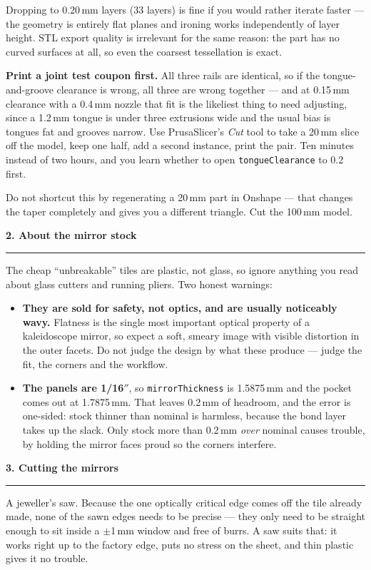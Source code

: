 \documentclass[letterpaper,11pt]{article}
\newcommand{\head}[1]{\vspace{3mm}\textbf{\large #1}\vspace{1mm}\hrule\vspace{2mm}}
\begin{document}
Dropping to 0.20\,mm layers (33 layers) is fine if you would rather iterate faster --- the
geometry is entirely flat planes and ironing works independently of layer height. STL export
quality is irrelevant for the same reason: the part has no curved surfaces at all, so even the
coarsest tessellation is exact.

\medskip

\textbf{Print a joint test coupon first.} All three rails are identical, so if the
tongue-and-groove clearance is wrong, all three are wrong together --- and at 0.15\,mm
clearance with a 0.4\,mm nozzle that fit is the likeliest thing to need adjusting, since a
1.2\,mm tongue is under three extrusions wide and the usual bias is tongues fat and grooves
narrow. Use PrusaSlicer's \emph{Cut} tool to take a 20\,mm slice off the model, keep one half,
add a second instance, print the pair. Ten minutes instead of two hours, and you learn whether
to open \texttt{tongueClearance} to 0.2 first.

Do not shortcut this by regenerating a 20\,mm part in Onshape --- that changes the taper
completely and gives you a different triangle. Cut the 100\,mm model.

\head{2. About the mirror stock}

The cheap ``unbreakable'' tiles are plastic, not glass, so ignore anything you read about
glass cutters and running pliers. Two honest warnings:

\begin{itemize}[leftmargin=*]
\item \textbf{They are sold for safety, not optics, and are usually noticeably wavy.}
      Flatness is the single most important optical property of a kaleidoscope mirror, so
      expect a soft, smeary image with visible distortion in the outer facets. Do not judge
      the design by what these produce --- judge the fit, the corners and the workflow.
\item \textbf{The panels are 1/16$''$}, so \texttt{mirrorThickness} is 1.5875\,mm and the
      pocket comes out at 1.7875\,mm. That leaves 0.2\,mm of headroom, and the error is
      one-sided: stock thinner than nominal is harmless, because the bond layer takes up the
      slack. Only stock more than 0.2\,mm \emph{over} nominal causes trouble, by holding the
      mirror faces proud so the corners interfere.
\end{itemize}

\head{3. Cutting the mirrors}

A jeweller's saw. Because the one optically critical edge comes off the tile already made,
none of the sawn edges needs to be precise --- they only need to be straight enough to sit
inside a $\pm$1\,mm window and free of burrs. A saw suits that: it works right up to the
factory edge, puts no stress on the sheet, and thin plastic gives it no trouble.
\end{document}

